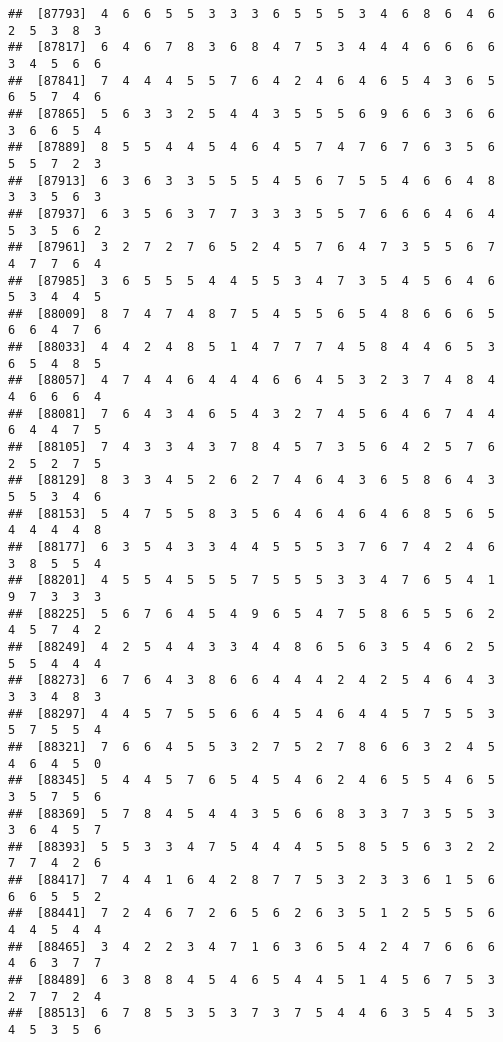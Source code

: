 \documentclass[
]{book}
\begin{document}
\begin{verbatim}
##  [87793]  4  6  6  5  5  3  3  3  6  5  5  5  3  4  6  8  6  4  6  2  5  3  8  3
##  [87817]  6  4  6  7  8  3  6  8  4  7  5  3  4  4  4  6  6  6  6  3  4  5  6  6
##  [87841]  7  4  4  4  5  5  7  6  4  2  4  6  4  6  5  4  3  6  5  6  5  7  4  6
##  [87865]  5  6  3  3  2  5  4  4  3  5  5  5  6  9  6  6  3  6  6  3  6  6  5  4
##  [87889]  8  5  5  4  4  5  4  6  4  5  7  4  7  6  7  6  3  5  6  5  5  7  2  3
##  [87913]  6  3  6  3  3  5  5  5  4  5  6  7  5  5  4  6  6  4  8  3  3  5  6  3
##  [87937]  6  3  5  6  3  7  7  3  3  3  5  5  7  6  6  6  4  6  4  5  3  5  6  2
##  [87961]  3  2  7  2  7  6  5  2  4  5  7  6  4  7  3  5  5  6  7  4  7  7  6  4
##  [87985]  3  6  5  5  5  4  4  5  5  3  4  7  3  5  4  5  6  4  6  5  3  4  4  5
##  [88009]  8  7  4  7  4  8  7  5  4  5  5  6  5  4  8  6  6  6  5  6  6  4  7  6
##  [88033]  4  4  2  4  8  5  1  4  7  7  7  4  5  8  4  4  6  5  3  6  5  4  8  5
##  [88057]  4  7  4  4  6  4  4  4  6  6  4  5  3  2  3  7  4  8  4  4  6  6  6  4
##  [88081]  7  6  4  3  4  6  5  4  3  2  7  4  5  6  4  6  7  4  4  6  4  4  7  5
##  [88105]  7  4  3  3  4  3  7  8  4  5  7  3  5  6  4  2  5  7  6  2  5  2  7  5
##  [88129]  8  3  3  4  5  2  6  2  7  4  6  4  3  6  5  8  6  4  3  5  5  3  4  6
##  [88153]  5  4  7  5  5  8  3  5  6  4  6  4  6  4  6  8  5  6  5  4  4  4  4  8
##  [88177]  6  3  5  4  3  3  4  4  5  5  5  3  7  6  7  4  2  4  6  3  8  5  5  4
##  [88201]  4  5  5  4  5  5  5  7  5  5  5  3  3  4  7  6  5  4  1  9  7  3  3  3
##  [88225]  5  6  7  6  4  5  4  9  6  5  4  7  5  8  6  5  5  6  2  4  5  7  4  2
##  [88249]  4  2  5  4  4  3  3  4  4  8  6  5  6  3  5  4  6  2  5  5  5  4  4  4
##  [88273]  6  7  6  4  3  8  6  6  4  4  4  2  4  2  5  4  6  4  3  3  3  4  8  3
##  [88297]  4  4  5  7  5  5  6  6  4  5  4  6  4  4  5  7  5  5  3  5  7  5  5  4
##  [88321]  7  6  6  4  5  5  3  2  7  5  2  7  8  6  6  3  2  4  5  4  6  4  5  0
##  [88345]  5  4  4  5  7  6  5  4  5  4  6  2  4  6  5  5  4  6  5  3  5  7  5  6
##  [88369]  5  7  8  4  5  4  4  3  5  6  6  8  3  3  7  3  5  5  3  3  6  4  5  7
##  [88393]  5  5  3  3  4  7  5  4  4  4  5  5  8  5  5  6  3  2  2  7  7  4  2  6
##  [88417]  7  4  4  1  6  4  2  8  7  7  5  3  2  3  3  6  1  5  6  6  6  5  5  2
##  [88441]  7  2  4  6  7  2  6  5  6  2  6  3  5  1  2  5  5  5  6  4  4  5  4  4
##  [88465]  3  4  2  2  3  4  7  1  6  3  6  5  4  2  4  7  6  6  6  4  6  3  7  7
##  [88489]  6  3  8  8  4  5  4  6  5  4  4  5  1  4  5  6  7  5  3  2  7  7  2  4
##  [88513]  6  7  8  5  3  5  3  7  3  7  5  4  4  6  3  5  4  5  3  4  5  3  5  6

\end{verbatim}
\end{document}
